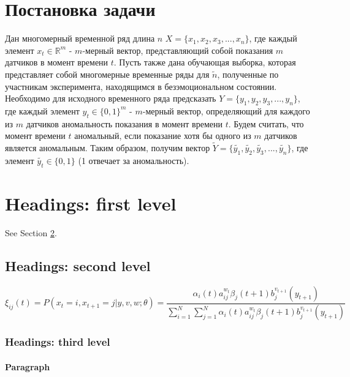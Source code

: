 \documentclass{article}
\begin{document}
\section{Постановка задачи}
Дан многомерный временной ряд длина $n$ $X = \{x_1, x_2, x_3, ..., x_n\}$, где каждый элемент $x_t \in \mathbb{R}^{m}$ - $m$-мерный вектор, представляющий собой показания $m$ датчиков в момент времени $t$. Пусть также дана обучающая выборка, которая представляет собой многомерные временные ряды для $\widetilde{n}$, полученные по участникам эксперимента, находящимся в безэмоциональном состоянии. Необходимо для исходного временного ряда предсказать $Y = \{y_1, y_2, y_3, ..., y_n\}$, где каждый элемент $y_t \in \{0, 1\}^{m}$ - $m$-мерный вектор, определяющий для каждого из $m$ датчиков аномальность показания в момент времени $t$. Будем считать, что момент времени $t$ аномальный, если показание хотя бы одного из $m$ датчиков является аномальным. Таким образом, получим вектор $\widetilde{Y} = \{\widetilde{y_1}, \widetilde{y_2}, \widetilde{y_3}, ..., \widetilde{y_n}\}$, где элемент $\widetilde{y_t} \in \{0, 1\}$ (1 отвечает за аномальность).


\section{Headings: first level}
\label{sec:headings}

\lipsum[4] See Section \ref{sec:headings}.

\subsection{Headings: second level}
\lipsum[5]
\begin{equation}
	\xi _{ij}(t)=P(x_{t}=i,x_{t+1}=j|y,v,w;\theta)= {\frac {\alpha _{i}(t)a^{w_t}_{ij}\beta _{j}(t+1)b^{v_{t+1}}_{j}(y_{t+1})}{\sum _{i=1}^{N} \sum _{j=1}^{N} \alpha _{i}(t)a^{w_t}_{ij}\beta _{j}(t+1)b^{v_{t+1}}_{j}(y_{t+1})}}
\end{equation}

\subsubsection{Headings: third level}
\lipsum[6]

\paragraph{Paragraph}
\lipsum[7]
\end{document}
